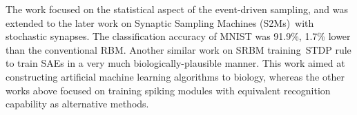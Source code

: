 The work focused on the statistical aspect of the event-driven sampling, and was extended to the later work on Synaptic Sampling Machines (S2Ms)~\DIFdelbegin {}\DIFdelend \DIFaddbegin {}\DIFaddend with stochastic synapses.
The classification accuracy of MNIST was 91.9\%, 1.7\% lower than the conventional RBM.
Another similar work on SRBM training~\DIFdelbegin {}\DIFdelend \DIFaddbegin {}\DIFaddend STDP rule to train SAEs in a very much biologically-plausible manner.
This work aimed at constructing artificial machine learning algorithms \DIFdelbegin {}\DIFdelend \DIFaddbegin {}\DIFaddend to biology, whereas the other works above focused on training spiking \DIFdelbegin {}\DIFdelend \DIFaddbegin {}\DIFaddend modules with equivalent recognition capability as alternative \DIFdelbegin {}\DIFdelend \DIFaddbegin {}\DIFaddend methods.

